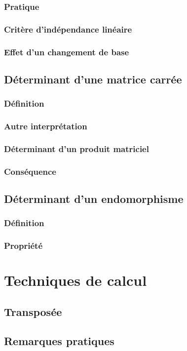 \documentclass[12pt,a4paper,french]{book}
\begin{document}
			\subsubsection{Pratique}
			\subsubsection{Critère d'indépendance linéaire}
			\subsubsection{Effet d'un changement de base}
		\subsection{Déterminant d'une matrice carrée}
			\subsubsection{Définition}	
			\subsubsection{Autre interprétation}
			\subsubsection{Déterminant d'un produit matriciel}
			\subsubsection{Conséquence}
		\subsection{Déterminant d'un endomorphisme}
			\subsubsection{Définition}
			\subsubsection{Propriété}
	\section{Techniques de calcul}
		\subsection{Transposée}
		\subsection{Remarques pratiques}
\end{document}
